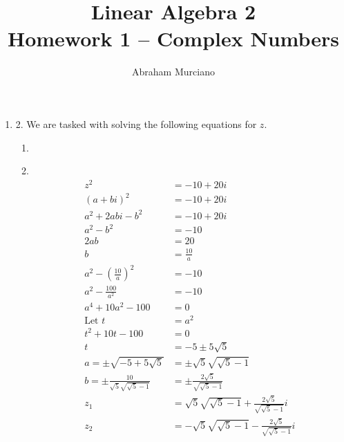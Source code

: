 \documentclass[fleqn]{article}
\title{Linear Algebra 2 \\
\medskip
\large Homework 1 -- Complex Numbers}
\author{Abraham Murciano}
\newenvironment{answers}{ %
	\begin{enumerate}
		\setlength{\itemsep}{\bigskipamount}
}{\end{enumerate}}
\newcommand\Item[1][]{ %
  \ifx\relax#1\relax  \item \else \item[#1] \fi
  \abovedisplayskip=0pt\abovedisplayshortskip=0pt~\vspace*{-\baselineskip}}
\begin{document}
\maketitle

\begin{answers}

	\item[2.]
		We are tasked with solving the following equations for \(z\).
		\begin{enumerate}
			\Item[(b)]
				\begin{align*}
					z^2                                            & = -10+20i \\
					(a + bi)^2                                     & = -10+20i \\
					a^2 + 2abi - b^2                               & = -10+20i \\
					a^2 -b^2                                       & = -10 \\
					2ab                                            & = 20 \\
					b                                              & = \frac{10}{a} \\
					a^2 -\left( \frac{10}{a} \right)^2             & = -10 \\
					a^2 - \frac{100}{a^2}                          & = -10 \\
					a^4 + 10a^2 - 100                              & = 0 \\
					\text{Let } t                                  & = a^2 \\
					t^2 + 10t - 100                                & = 0 \\
					t                                              & = -5 \pm 5 \sqrt{5} \\
					a = \pm\sqrt{-5+5\sqrt{5}}                     & = \pm\sqrt{5}\sqrt{\sqrt{5} - 1} \\
					b = \pm \frac{10}{\sqrt{5}\sqrt{\sqrt{5} - 1}} & = \pm \frac{2\sqrt{5}}{\sqrt{\sqrt{5} - 1}} \\
					z_1                                            & = \sqrt{5}\sqrt{\sqrt{5} - 1} + \frac{2\sqrt{5}}{\sqrt{\sqrt{5} - 1}}i \\
					z_2                                            & = -\sqrt{5}\sqrt{\sqrt{5} - 1} - \frac{2\sqrt{5}}{\sqrt{\sqrt{5} - 1}}i
				\end{align*}
		\end{enumerate}

\end{answers}
\end{document}

